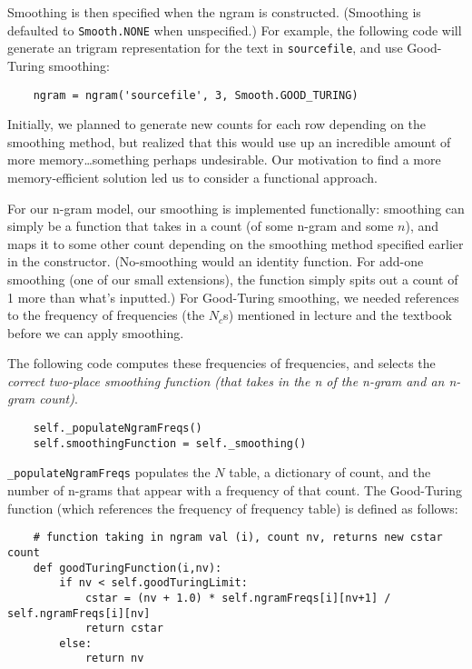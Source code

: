 \documentclass{article}
\begin{document}
Smoothing is then specified when the ngram is constructed. (Smoothing is defaulted to \texttt{Smooth.NONE} when unspecified.) For example, the following code will generate an trigram representation for the text in \texttt{sourcefile}, and use Good-Turing smoothing:
{\small\begin{verbatim}
    ngram = ngram('sourcefile', 3, Smooth.GOOD_TURING)
\end{verbatim}}

Initially, we planned to generate new counts for each row depending on the smoothing method, but realized that this would use up an incredible amount of more memory\ldots something perhaps undesirable. Our motivation to find a more memory-efficient solution led us to consider a functional approach.\par
For our n-gram model, our smoothing is implemented functionally: smoothing can simply be a function that takes in a count (of some n-gram and some $n$), and maps it to some other count depending on the smoothing method specified earlier in the constructor. (No-smoothing would an identity function. For add-one smoothing (one of our small extensions), the function simply spits out a count of 1 more than what's inputted.) For Good-Turing smoothing, we needed references to the frequency of frequencies (the $N_c$s) mentioned in lecture and the textbook before we can apply smoothing.\par

The following code computes these frequencies of frequencies, and selects the \emph{correct two-place smoothing function (that takes in the \emph{n} of the n-gram and an n-gram count)}.

{\small\begin{verbatim}
    self._populateNgramFreqs()
    self.smoothingFunction = self._smoothing()
\end{verbatim}}

\texttt{\_populateNgramFreqs} populates the $N$ table, a dictionary of count, and the number of n-grams that appear with a frequency of that count. The Good-Turing function (which references the frequency of frequency table) is defined as follows:

{\small\begin{verbatim}
    # function taking in ngram val (i), count nv, returns new cstar count
    def goodTuringFunction(i,nv):
        if nv < self.goodTuringLimit:
            cstar = (nv + 1.0) * self.ngramFreqs[i][nv+1] / self.ngramFreqs[i][nv]
            return cstar
        else:
            return nv
\end{verbatim}}
\end{document}
